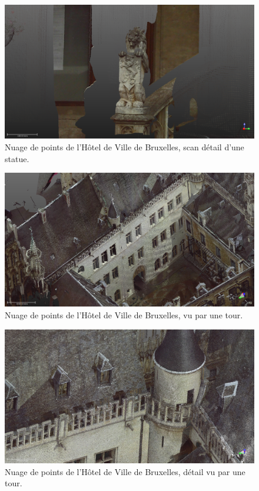 \documentclass[a4paper,10pt]{scrreprt}
\begin{document}
\begin{figure}[p]
\includegraphics[width=\textwidth]{HotelDeVille_09.png}
\caption{Nuage de points de l'Hôtel de Ville de Bruxelles, scan détail d'une statue.}
\label{fig:bru_townhall_statue}
\end{figure}

\begin{figure}[p]
\includegraphics[width=\textwidth]{HotelDeVille_07.png}
\caption{Nuage de points de l'Hôtel de Ville de Bruxelles, vu par une tour.}
\label{fig:bru_townhall_top}
\end{figure}

\begin{figure}[p]
\includegraphics[width=\textwidth]{HotelDeVille_04.png}
\caption{Nuage de points de l'Hôtel de Ville de Bruxelles, détail vu par une tour.}
\label{fig:bru_townhall_top2}
\end{figure}
\end{document}
